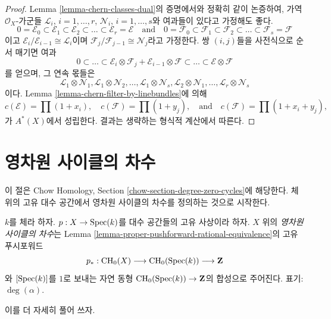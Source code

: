 \begin{proof}
Lemma \ref{lemma-chern-classes-dual}의 증명에서와 정확히 같이 논증하여,
가역 $\mathcal{O}_X$-가군들
${\mathcal L}_i$, $i = 1, \ldots, r$,
${\mathcal N}_i$, $i = 1, \ldots, s$와 여과들이 있다고
가정해도 좋다.
$$
0 = \mathcal{E}_0 \subset \mathcal{E}_1 \subset \mathcal{E}_2
\subset \ldots \subset \mathcal{E}_r = \mathcal{E}
\quad\text{and}\quad
0 = \mathcal{F}_0 \subset \mathcal{F}_1 \subset \mathcal{F}_2
\subset \ldots \subset \mathcal{F}_s = \mathcal{F}
$$
이고
$\mathcal{E}_i/\mathcal{E}_{i - 1} \cong \mathcal{L}_i$이며
$\mathcal{F}_j/\mathcal{F}_{j - 1} \cong \mathcal{N}_j$라고
가정한다. 쌍 $(i, j)$들을 사전식으로 순서 매기면 여과
$$
0 \subset \ldots \subset
\mathcal{E}_i \otimes \mathcal{F}_j
+
\mathcal{E}_{i - 1} \otimes \mathcal{F}
\subset \ldots \subset \mathcal{E} \otimes \mathcal{F}
$$
를 얻으며, 그 연속 몫들은
$$
\mathcal{L}_1 \otimes \mathcal{N}_1,
\mathcal{L}_1 \otimes \mathcal{N}_2,
\ldots,
\mathcal{L}_1 \otimes \mathcal{N}_s,
\mathcal{L}_2 \otimes \mathcal{N}_1,
\ldots,
\mathcal{L}_r \otimes \mathcal{N}_s
$$
이다. Lemma \ref{lemma-chern-filter-by-linebundles}에 의해
$$
c(\mathcal{E}) = \prod (1 + x_i),
\quad
c(\mathcal{F}) = \prod (1 + y_j),
\quad\text{and}\quad
c(\mathcal{F}) = \prod (1 + x_i + y_j),
$$
가 $A^*(X)$에서 성립한다.
결과는 생략하는 형식적 계산에서 따른다.
\end{proof}

\section{영차원 사이클의 차수}
\label{section-degree-zero-cycles}

\noindent
이 절은 Chow Homology, Section
\ref{chow-section-degree-zero-cycles}에 해당한다.
체 위의 고유 대수 공간에서 영차원 사이클의 차수를 정의하는 것으로 시작한다.

\begin{definition}
\label{definition-degree-zero-cycle}
$k$를 체라 하자. $p : X \to \mathop{\mathrm{Spec}}(k)$를 대수 공간들의 고유 사상이라 하자.
$X$ 위의 {\it 영차원 사이클의 차수}는 Lemma
\ref{lemma-proper-pushforward-rational-equivalence}의 고유 푸시포워드
$$
p_* : \mathop{\mathrm{CH}}\nolimits_0(X) \longrightarrow \mathop{\mathrm{CH}}\nolimits_0(\mathop{\mathrm{Spec}}(k)) \longrightarrow \mathbf{Z}
$$
와 $[\mathop{\mathrm{Spec}}(k)]$를 $1$로 보내는 자연 동형
$\mathop{\mathrm{CH}}\nolimits_0(\mathop{\mathrm{Spec}}(k)) \to \mathbf{Z}$의 합성으로 주어진다.
표기: $\deg(\alpha)$.
\end{definition}

\noindent
이를 더 자세히 풀어 쓰자.

